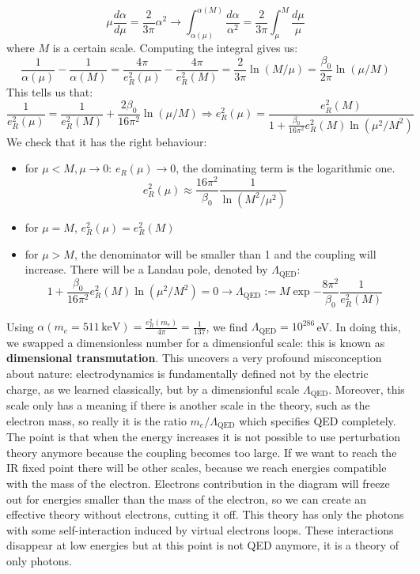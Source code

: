 \documentclass[../main.tex]{subfiles}
\begin{document}
\[
\mu\frac{d\alpha}{d\mu}=\frac{2}{3\pi}\alpha^2\to\int_{\alpha(\mu)}^{\alpha(M)}\frac{d\alpha}{\alpha^2}=\frac{2}{3\pi}\int_\mu^M\frac{d\mu}{\mu}
\]
where $M$ is a certain scale. Computing the integral gives us:
\[
\frac{1}{\alpha(\mu)}-\frac{1}{\alpha(M)}=\frac{4\pi}{e_R^2(\mu)}-\frac{4\pi}{e_R^2(M)}=\frac{2}{3\pi}\ln{(M/\mu)}=\frac{\beta_0}{2\pi}\ln{(\mu/M)}
\]
This tells us that:
\[
\frac{1}{e_R^2(\mu)}=\frac{1}{e_R^2(M)}+\frac{2\beta_0}{16\pi^2}\ln(\mu/M)\Rightarrow e_R^2(\mu)=\frac{e_R^2(M)}{1+\frac{\beta_0}{16\pi^2}e_R^2(M)\ln(\mu^2/M^2)}
\]
We check that it has the right behaviour:
\begin{itemize}
    \item for $\mu<M, \mu\to0$: $e_R(\mu)\to0$, the dominating term is the logarithmic one.
    \[
    e_R^2(\mu)\approx\frac{16\pi^2}{\beta_0}\frac{1}{\ln(M^2/\mu^2)}
    \]
    \item for $\mu=M$, $e_R^2(\mu)=e_R^2(M)$
    \item for $\mu>M$, the denominator will be smaller than 1 and the coupling will increase. There will be a Landau pole, denoted by $\Lambda_{\text{QED}}$:
    \[
    1+\frac{\beta_0}{16\pi^2}e_R^2(M)\ln(\mu^2/M^2)=0\to\Lambda_{\text{QED}}:=M\exp{-\frac{8\pi^2}{\beta_0}\frac{1}{e_R^2(M)}}
    \]
\end{itemize}
Using $\alpha(m_e=511\,\text{keV})=\frac{e_R^2(m_e)}{4\pi}=\frac{1}{137}$, we find $\Lambda_{\text{QED}}=10^{286}$\,eV. In doing this, we swapped a dimensionless number for a dimensionful scale: this is known as \textbf{dimensional transmutation}. This uncovers a very profound misconception about nature: electrodynamics is fundamentally defined not by the electric charge, as we learned classically, but by a dimensionful scale $\Lambda_{\text{QED}}$. Moreover, this scale only has a meaning if there is another scale in the theory, such as the electron mass, so really it is the ratio $m_e/\Lambda_{\text{QED}}$ which specifies QED completely.\\
The point is that when the energy increases it is not possible to use perturbation theory anymore because the coupling becomes too large. If we want to reach the IR fixed point there will be other scales, because we reach energies compatible with the mass of the electron. Electrons contribution in the diagram will freeze out for energies smaller than the mass of the electron, so we can create an effective theory without electrons, cutting it off. This theory has only the photons with some self-interaction induced by virtual electrons loops. These interactions disappear at low energies but at this point is not QED anymore, it is a theory of only photons.\\
\end{document}
